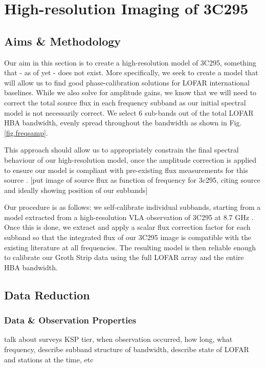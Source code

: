 \chapter{High-resolution Imaging of 3C295}

\section{Aims \& Methodology}
\pg
Our aim in this section is to create a high-resolution model of 3C295, something that - as
of yet - does not exist. More specifically, we seek to create a model that will allow us to find
good phase-calibration solutions for LOFAR international baselines. While we also solve for
amplitude gains, we know that we will need to correct the total source flux in each frequency
subband as our initial spectral model is not necessarily correct.
We select 6 sub-bands out of the total LOFAR HBA bandwidth, evenly spread throughout the bandwidth as shown in Fig. \ref{fig.freqsamp}.

\pg
This approach should allow us to appropriately constrain the final spectral behaviour of our high-resolution model, once the amplitude correction is applied to ensure our model is compliant with pre-existing flux measurements for this source . [put image of source flux as function of frequency for 3c295, citing source and ideally showing position of our subbands]

\pg
Our procedure is as follows: we self-calibrate individual subbands, starting from a model
extracted from a high-resolution VLA observation of 3C295 at 8.7 GHz . Once this is done,
we extract and apply a scalar flux correction factor for each subband so that the integrated flux of our 3C295 image is compatible with the existing literature at all frequencies. The resulting model is then reliable enough to calibrate our Groth Strip data using the full LOFAR array and the entire HBA bandwidth.

\section{Data Reduction}

\subsection{Data \& Observation Properties}
\pg
talk about surveys KSP tier, when observation occurred, how long, what frequency, describe subband structure of bandwidth, describe state of LOFAR and stations at the time, etc

